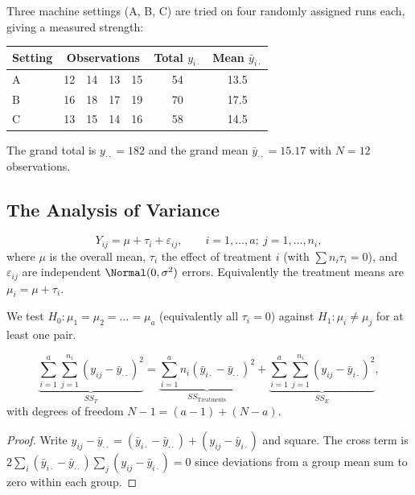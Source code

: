 \begin{example}\label{ex:anovadata}
Three machine settings (A, B, C) are tried on four randomly assigned runs each, giving a measured strength:
\begin{center}
\begin{tabular}{lcccc|cc}
\toprule
Setting & \multicolumn{4}{c|}{Observations} & Total $y_{i\cdot}$ & Mean $\bar{y}_{i\cdot}$\\
\midrule
A & 12 & 14 & 13 & 15 & 54 & 13.5\\
B & 16 & 18 & 17 & 19 & 70 & 17.5\\
C & 13 & 15 & 14 & 16 & 58 & 14.5\\
\bottomrule
\end{tabular}
\end{center}
The grand total is $y_{\cdot\cdot}=182$ and the grand mean $\bar{y}_{\cdot\cdot}=15.17$ with $N=12$ observations.
\end{example}

\subsection{The Analysis of Variance}

\begin{definition}
\[ Y_{ij}=\mu+\tau_i+\varepsilon_{ij},\qquad i=1,\dots,a;\ j=1,\dots,n_i, \]
where $\mu$ is the overall mean, $\tau_i$ the effect of treatment $i$ (with $\sum n_i\tau_i=0$), and $\varepsilon_{ij}$ are independent $\Normal(0,\sigma^2)$ errors. Equivalently the treatment means are $\mu_i=\mu+\tau_i$.
\end{definition}

We test $H_0:\mu_1=\mu_2=\dots=\mu_a$ (equivalently all $\tau_i=0$) against $H_1:\mu_i\ne\mu_j$ for at least one pair.

\begin{theorem}\label{thm:anova-ss}
\[ \underbrace{\sum_{i=1}^a\sum_{j=1}^{n_i}(y_{ij}-\bar{y}_{\cdot\cdot})^2}_{SS_T}=\underbrace{\sum_{i=1}^an_i(\bar{y}_{i\cdot}-\bar{y}_{\cdot\cdot})^2}_{SS_{\mathrm{Treatments}}}+\underbrace{\sum_{i=1}^a\sum_{j=1}^{n_i}(y_{ij}-\bar{y}_{i\cdot})^2}_{SS_E}, \]
with degrees of freedom $N-1=(a-1)+(N-a)$.
\end{theorem}

\begin{proof}
Write $y_{ij}-\bar{y}_{\cdot\cdot}=(\bar{y}_{i\cdot}-\bar{y}_{\cdot\cdot})+(y_{ij}-\bar{y}_{i\cdot})$ and square. The cross term is $2\sum_i(\bar{y}_{i\cdot}-\bar{y}_{\cdot\cdot})\sum_j(y_{ij}-\bar{y}_{i\cdot})=0$ since deviations from a group mean sum to zero within each group.
\end{proof}

